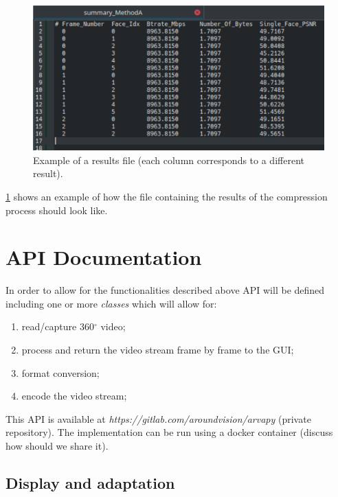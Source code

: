 \documentclass{article}
\begin{document}
\begin{figure}[htbp]
    \centering
    \includegraphics[width=1\textwidth]{results_file_example.png}
    \caption{Example of a results file (each column corresponds to a different result).}
    \label{fig:results_file_example}
\end{figure}

\cref{fig:results_file_example} shows an example of how the file containing the results of the compression process should look like.


\section{API Documentation}

In order to allow for the functionalities described above API will be defined including one or more \textit{classes} which will allow for:
\begin{enumerate}
    \item read/capture 360$^\circ$ video;
    \item process and return the video stream frame by frame to the GUI;
    \item format conversion;
    \item encode the video stream;
\end{enumerate}

This API is available at \textit{https://gitlab.com/aroundvision/arvapy} (private repository). The implementation can be run using a docker container (discuss how should we share it).


\subsection{Display and adaptation}
\end{document}
